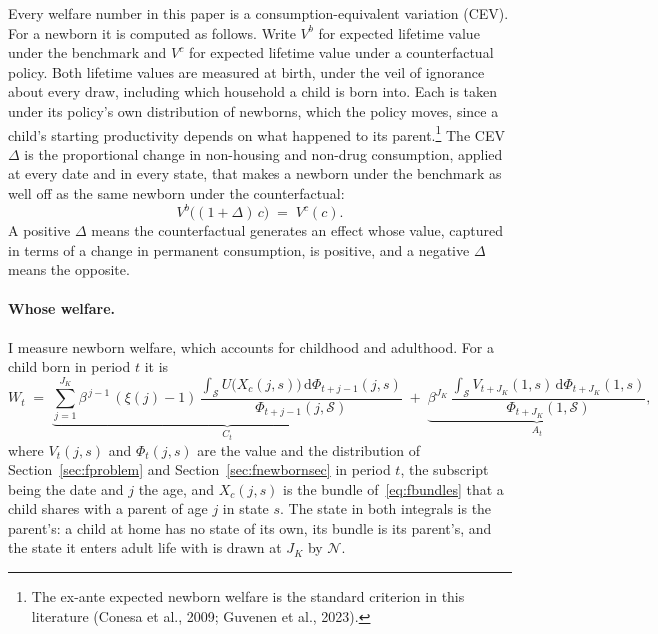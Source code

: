 \documentclass[10pt]{article}
\begin{document}
Every welfare number in this paper is a consumption-equivalent variation (CEV). For a newborn it is computed as follows. Write
$V^{b}$ for expected lifetime value under the benchmark and $V^{c}$ for expected lifetime value under a
counterfactual policy.   Both lifetime values are measured at birth, under the veil of ignorance about every draw, including which household a child is born into. Each is taken under its policy's own distribution of newborns, which the policy moves, since a child's starting productivity depends on what happened to its parent.\footnote{The ex-ante expected newborn welfare is the standard criterion in this literature (Conesa et al., 2009; Guvenen et al., 2023).} The CEV $\Delta$ is the proportional change in
non-housing and non-drug consumption, applied at every date and in every state, that makes a newborn under
the benchmark as well off as the same newborn under the counterfactual:
%
\begin{equation}\label{eq:cev}
V^{b}\big((1+\Delta)\,c\big)\;=\;V^{c}(c) .
\end{equation}
%
  A positive $\Delta$ means the counterfactual generates an effect whose value, captured in terms of a change in permanent consumption, is positive, and a negative $\Delta$ means the opposite.

\paragraph{Whose welfare.}   I measure newborn welfare, which accounts for childhood and adulthood. For a child born in period $t$ it is
%
\begin{equation}\label{eq:newbornw}
W_t\;=\;\underbrace{\sum_{j=1}^{J_K}\beta^{\,j-1}\,(\xi(j)-1)\,\frac{\int_{\mathcal S}U\big(X_c(j,s)\big)\,\mathrm{d}\Phi_{t+j-1}(j,s)}{\Phi_{t+j-1}(j,\mathcal S)}}_{C_t}
\;+\;\underbrace{\beta^{J_K}\,\frac{\int_{\mathcal S}V_{t+J_K}(1,s)\,\mathrm{d}\Phi_{t+J_K}(1,s)}{\Phi_{t+J_K}(1,\mathcal S)}}_{A_t},
\end{equation}%
%
where $V_t(j,s)$ and $\Phi_t(j,s)$ are the value and the distribution of Section~\ref{sec:fproblem} and Section~\ref{sec:fnewbornsec} in period $t$, the subscript being the date and $j$ the age, and $X_c(j,s)$ is the bundle of~\eqref{eq:fbundles} that a child shares with a parent of age $j$ in state $s$. The state in both integrals is the parent's: a child at home has no state of its own, its bundle is its parent's, and the state it enters adult life with is drawn at $J_K$ by $\mathcal N$.
\end{document}
